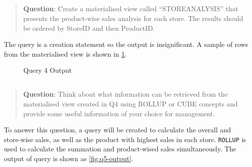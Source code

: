 \documentclass[
  a4paper,
]{article}
\begin{document}
\hypertarget{section-3}{%
\subsection{}\label{section-3}}

\begin{quote}
\textbf{Question}: Create a materialised view called ``STOREANALYSIS''
that presents the product-wise sales analysis for each store. The
results should be ordered by StoreID and then ProductID.
\end{quote}

The query is a creation statement so the output is insignificant. A
sample of rows from the materialised view is shown in
\cref{fig:q4-output}.

\begin{figure}
    \centering
    \caption{Query 4 Output\label{fig:q4-output}}
\end{figure}

\hypertarget{section-4}{%
\subsection{}\label{section-4}}

\begin{quote}
\textbf{Question}: Think about what information can be retrieved from
the materialised view created in Q4 using ROLLUP or CUBE concepts and
provide some useful information of your choice for management.
\end{quote}

To answer this question, a query will be created to calculate the
overall and store-wise sales, as well as the product with highest sales
in each store. \texttt{ROLLUP} is used to calculate the summation and
product-wised sales simultaneously. The output of query is shown as
\cref{fig:q5-output}.
\end{document}
